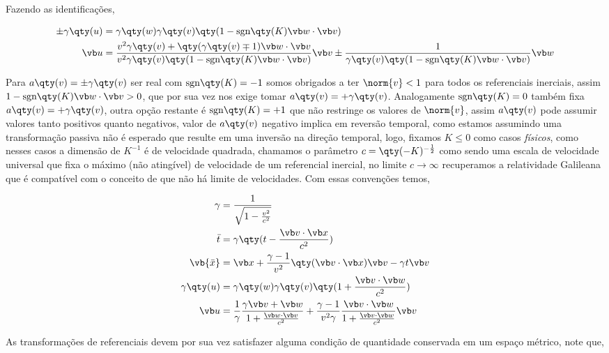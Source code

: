 \documentclass[twoside]{amsart}
\newcommand{\sgn}[1]{\mbox{sgn}\qty(#1)}
\numberwithin{equation}{section}
\begin{document}
Fazendo as identificações,

\begin{align}
    \pm\gamma\qty(u)&=\gamma\qty(w)\gamma\qty(v)\qty(1-\sgn K\vb w\cdot \vb v)\\
    \vb u &=\frac{v^2\gamma\qty(v)+\qty(\gamma\qty(v)\mp1)\vb w\cdot\vb v}{v^2\gamma\qty(v)\qty(1-\sgn K\vb w\cdot\vb v)}\vb v\pm\frac{1}{\gamma\qty(v)\qty(1-\sgn K \vb w\cdot \vb v)}\vb w
\end{align}

Para $a\qty(v)=\pm\gamma\qty(v)$ ser real com $\sgn K=-1$ somos obrigados a ter $\norm{v}< 1$ para todos os referenciais inerciais, assim $1-\sgn K \vb w\cdot \vb v>0$, que por sua vez nos exige tomar $a\qty(v)=+\gamma\qty(v)$. Analogamente $\sgn K=0$ também fixa $a\qty(v)=+\gamma\qty(v)$, outra opção restante é $\sgn K=+1$ que não restringe os valores de $\norm{v}$, assim $a\qty(v)$ pode assumir valores tanto positivos quanto negativos, valor de $a\qty(v)$ negativo implica em reversão temporal, como estamos assumindo uma transformação passiva não é esperado que resulte em uma inversão na direção temporal, logo, fixamos $K\leq 0$ como casos \emph{físicos}, como nesses casos a dimensão de $K^{-1}$ é de velocidade quadrada, chamamos o parâmetro $c=\qty(-K)^{-\frac12}$ como sendo uma escala de velocidade universal que fixa o máximo (não atingível) de velocidade de um referencial inercial, no limite $c\rightarrow \infty$ recuperamos a relatividade Galileana que é compatível com o conceito de que não há limite de velocidades. Com essas convenções temos,

\begin{align}
    \gamma&=\frac{1}{\sqrt{1-\frac{v^2}{c^2}}}\\
    {\bar t}&=\gamma\qty(t-\frac{\vb v\cdot\vb x}{c^2})\\
    \vb {\bar x}&=\vb x+\frac{\gamma-1}{v^2}\qty(\vb v \cdot \vb x)\vb v-\gamma t\vb v\\
    \gamma\qty(u)&=\gamma\qty(w)\gamma\qty(v)\qty(1+\frac{\vb v\cdot\vb w}{c^2})\\
    \vb u&=\frac1\gamma\frac{\gamma \vb v+\vb w}{1+\frac{\vb w \cdot\vb v}{c^2}}+\frac{\gamma-1}{v^2\gamma}\frac{\vb v\cdot \vb w}{1+\frac{\vb v\cdot \vb w}{c^2}}\vb v
\end{align}

As transformações de referenciais devem por sua vez satisfazer alguma condição de quantidade conservada em um espaço métrico, note que,
\end{document}
